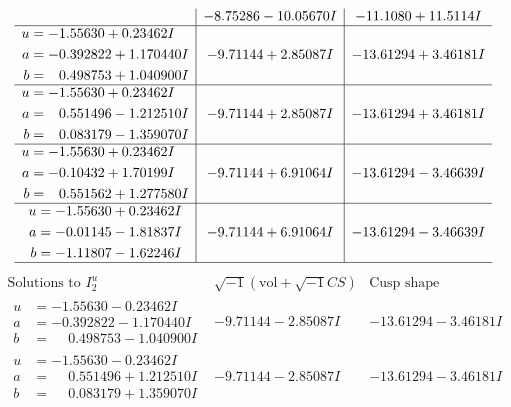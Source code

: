 \documentclass[1p]{elsarticle_modified}
\theoremstyle{definition}
\newcommand{\I}{\sqrt{-1}}
\begin{document}
$$\begin{array}{c|c|c}
 & -8.75286 - 10.05670 I & -11.1080 + 11.5114 I \\ \hline\begin{aligned}
u &= -1.55630 + 0.23462 I \\
a &= -0.392822 + 1.170440 I \\
b &= \phantom{-}0.498753 + 1.040900 I\end{aligned}
 & -9.71144 + 2.85087 I & -13.61294 + 3.46181 I \\ \hline\begin{aligned}
u &= -1.55630 + 0.23462 I \\
a &= \phantom{-}0.551496 - 1.212510 I \\
b &= \phantom{-}0.083179 - 1.359070 I\end{aligned}
 & -9.71144 + 2.85087 I & -13.61294 + 3.46181 I \\ \hline\begin{aligned}
u &= -1.55630 + 0.23462 I \\
a &= -0.10432 + 1.70199 I \\
b &= \phantom{-}0.551562 + 1.277580 I\end{aligned}
 & -9.71144 + 6.91064 I & -13.61294 - 3.46639 I \\ \hline\begin{aligned}
u &= -1.55630 + 0.23462 I \\
a &= -0.01145 - 1.81837 I \\
b &= -1.11807 - 1.62246 I\end{aligned}
 & -9.71144 + 6.91064 I & -13.61294 - 3.46639 I\\
 \hline 
 \end{array}$$\newpage$$\begin{array}{c|c|c}  
\text{Solutions to }I^u_{2}& \I (\text{vol} + \sqrt{-1}CS) & \text{Cusp shape}\\
 \hline 
\begin{aligned}
u &= -1.55630 - 0.23462 I \\
a &= -0.392822 - 1.170440 I \\
b &= \phantom{-}0.498753 - 1.040900 I\end{aligned}
 & -9.71144 - 2.85087 I & -13.61294 - 3.46181 I \\ \hline\begin{aligned}
u &= -1.55630 - 0.23462 I \\
a &= \phantom{-}0.551496 + 1.212510 I \\
b &= \phantom{-}0.083179 + 1.359070 I\end{aligned}
 & -9.71144 - 2.85087 I & -13.61294 - 3.46181 I \\ \hline\begin{aligned}

\end{aligned}
\end{array}$$
\end{document}
